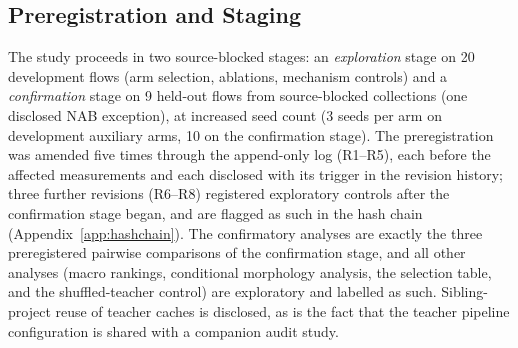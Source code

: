 \subsection{Preregistration and Staging}\label{sec:staging}\label{sec:limitations-revision}
The study proceeds in two source-blocked stages: an \emph{exploration} stage
on 20 development flows (arm selection, ablations, mechanism controls)
and a \emph{confirmation} stage on 9 held-out flows from source-blocked
collections (one disclosed NAB exception), at increased seed count
(3 seeds per arm on development auxiliary arms, 10 on the confirmation
stage). The preregistration was amended five
times through the append-only log (R1--R5), each before the affected
measurements and each disclosed with its trigger in the revision
history; three further revisions (R6--R8) registered exploratory
controls after the confirmation stage began, and are flagged as such in
the hash chain (Appendix~\ref{app:hashchain}). The confirmatory analyses are exactly the three preregistered
pairwise comparisons of the confirmation stage, and all other analyses
(macro rankings, conditional morphology analysis, the selection table,
and the shuffled-teacher control) are exploratory and labelled as such.
Sibling-project reuse of teacher caches is disclosed, as is the fact
that the teacher pipeline configuration is shared with a companion
audit study.

